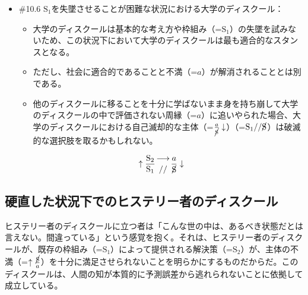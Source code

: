 \begin{note}{}
  \begin{itemize}
    \tightlist
    \item{\#10.6}
      $\textrm{S}_1$を失墜させることが困難な状況における\mbox{大学のディスクール}：
      \begin{itemize}
          \tightlist
          \item
          \mbox{大学のディスクール}は基本的な考え方や枠組み（=$\textrm{S}_1$）の失墜を試みないため、この状況下において\mbox{大学のディスクール}は最も適合的なスタンスとなる。
          \item
          ただし、社会に適合的であることと不満（=$a$）が解消されることとは別である。
          \item
          他のディスクールに移ることを十分に学ばないまま身を持ち崩して\mbox{大学のディスクール}の中で評価されない周縁（=$a$）に追いやられた場合、\mbox{大学のディスクール}における自己滅却的な主体（=$\frac{a}{\cancel{\textrm{S}}}\downarrow$）（=$\textrm{S}_1//\cancel{\textrm{S}}$）は破滅的な選択肢を取るかもしれない。
        \end{itemize}

$$
\uparrow\frac{\mathrm{S_2}}{\mathrm{S_1}}\genfrac{}{}{0pt}{}{\longrightarrow}{//}\frac{a}{\cancel{\textrm{S}}}\downarrow
$$
  \end{itemize}
\end{note}

\subsection{硬直した状況下でのヒステリー者のディスクール}\label{ux786cux76f4ux3057ux305fux72b6ux6cc1ux4e0bux3067ux306eux30d2ux30b9ux30c6ux30eaux30fcux8005ux306eux30c7ux30a3ux30b9ux30afux30fcux30eb}

\mbox{ヒステリー者のディスクール}に立つ者は「こんな世の中は、あるべき状態だとは言えない。間違っている」という感覚を抱く。それは、\mbox{ヒステリー者のディスクール}が、既存の枠組み（=\(\textrm{S}_1\)）によって提供される解決策（=\(\textrm{S}_2\)）が、主体の不満（=\(\uparrow\frac{\cancel{\textrm{S}}}{a}\)）を十分に満足させられないことを明らかにするものだからだ。このディスクールは、人間の知が本質的に予測誤差から逃れられないことに依拠して成立している。

